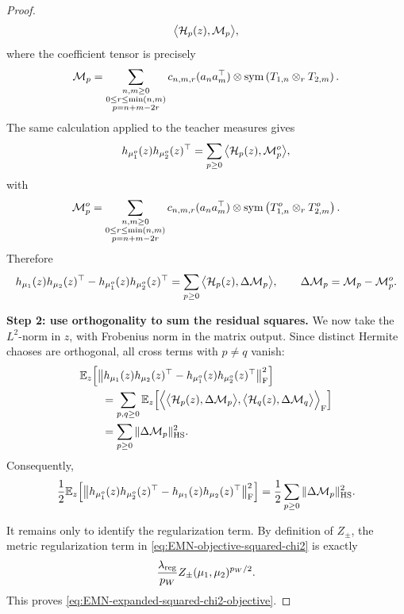 \begin{proof}
\begin{equation}
    \big\langle \mathcal{H}_p(z),\mathcal M_p\big\rangle,
\end{equation}
where the coefficient tensor is precisely
\begin{equation}
    \mathcal M_p
    =
    \sum_{\substack{n,m\ge0\\0\le r\le \min(n,m)\\p=n+m-2r}}
    c_{n,m,r}
    (a_na_m^\top)\otimes
    \mathrm{sym}\left({T_{1,n}\otimes_{r}T_{2,m}}\right).
\end{equation}
The same calculation applied to the teacher measures gives
\begin{equation}
    h_{\mu_1^o}(z)h_{\mu_2^o}(z)^\top
    =
    \sum_{p\ge0}
    \big\langle \mathcal{H}_p(z),\mathcal M_p^o\big\rangle,
\end{equation}
with
\begin{equation}
    \mathcal M_p^o
    =
    \sum_{\substack{n,m\ge0\\0\le r\le \min(n,m)\\p=n+m-2r}}
    c_{n,m,r}
    (a_na_m^\top)\otimes
    \mathrm{sym}\left({T_{1,n}^o\otimes_{r}T_{2,m}^o}\right).
\end{equation}
Therefore
\begin{equation}
    h_{\mu_1}(z)h_{\mu_2}(z)^\top
    -
    h_{\mu_1^o}(z)h_{\mu_2^o}(z)^\top
    =
    \sum_{p\ge0}
    \big\langle \mathcal{H}_p(z),\Delta\mathcal M_p\big\rangle,
    \qquad
    \Delta\mathcal M_p=\mathcal M_p-\mathcal M_p^o .
\end{equation}

\par\noindent\textbf{Step 2: use orthogonality to sum the residual squares.}
We now take the \(L^2\)-norm in \(z\), with Frobenius norm in the
matrix output.  Since distinct Hermite chaoses are orthogonal, all
cross terms with \(p\neq q\) vanish:
\begin{align}
    &\mathbb{E}_z
    \Big[
        \big\|
        h_{\mu_1}(z)h_{\mu_2}(z)^\top
        -
        h_{\mu_1^o}(z)h_{\mu_2^o}(z)^\top
        \big\|_{\mathrm F}^2
    \Big]
    \notag\\
    &\qquad =
    \sum_{p,q\ge0}
    \mathbb{E}_z
    \Big[
        \Big\langle
            \big\langle \mathcal{H}_p(z),\Delta\mathcal M_p\big\rangle,
            \big\langle \mathcal{H}_q(z),\Delta\mathcal M_q\big\rangle
        \Big\rangle_{\mathrm F}
    \Big]
    \notag\\
    &\qquad =
    \sum_{p\ge0}
    \|\Delta\mathcal M_p\|_{\mathrm{HS}}^2 .
\end{align}
Consequently,
\begin{equation}
    \frac12
    \mathbb{E}_z
    \Big[
        \big\|
        h_{\mu_1^o}(z)h_{\mu_2^o}(z)^\top
        -
        h_{\mu_1}(z)h_{\mu_2}(z)^\top
        \big\|_{\mathrm F}^2
    \Big]
    =
    \frac12
    \sum_{p\ge0}
    \|\Delta\mathcal M_p\|_{\mathrm{HS}}^2 .
\end{equation}

It remains only to identify the regularization term.  By definition of
\(Z_\pm\), the metric regularization term in \eqref{eq:EMN-objective-squared-chi2} is exactly
\[
    \frac{\lambda_{\mathrm{reg}}}{p_W}Z_\pm(\mu_1,\mu_2)^{p_W/2}.
\]
This proves \eqref{eq:EMN-expanded-squared-chi2-objective}.
\end{proof}

